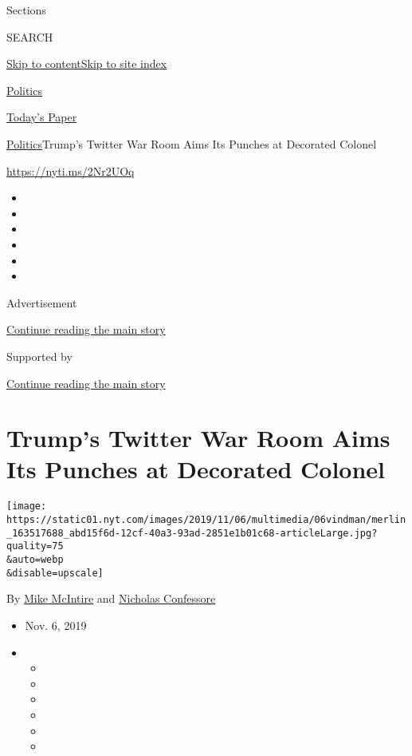 Sections

SEARCH

\protect\hyperlink{site-content}{Skip to
content}\protect\hyperlink{site-index}{Skip to site index}

\href{https://www.nytimes.com/section/politics}{Politics}

\href{https://myaccount.nytimes.com/auth/login?response_type=cookie\&client_id=vi}{}

\href{https://www.nytimes.com/section/todayspaper}{Today's Paper}

\href{/section/politics}{Politics}\textbar{}Trump's Twitter War Room
Aims Its Punches at Decorated Colonel

\url{https://nyti.ms/2Nr2UOq}

\begin{itemize}
\item
\item
\item
\item
\item
\item
\end{itemize}

Advertisement

\protect\hyperlink{after-top}{Continue reading the main story}

Supported by

\protect\hyperlink{after-sponsor}{Continue reading the main story}

\hypertarget{trumps-twitter-war-room-aims-its-punches-at-decorated-colonel}{%
\section{Trump's Twitter War Room Aims Its Punches at Decorated
Colonel}\label{trumps-twitter-war-room-aims-its-punches-at-decorated-colonel}}

\texttt{[image: https://static01.nyt.com/images/2019/11/06/multimedia/06vindman/merlin\_163517688\_abd15f6d-12cf-40a3-93ad-2851e1b01c68-articleLarge.jpg?quality=75\\\&auto=webp\\\&disable=upscale]}

By \href{https://www.nytimes.com/by/mike-mcintire}{Mike McIntire} and
\href{https://www.nytimes.com/by/nicholas-confessore}{Nicholas
Confessore}

\begin{itemize}
\item
  Nov. 6, 2019
\item
  \begin{itemize}
  \item
  \item
  \item
  \item
  \item
  \item
  \end{itemize}
\end{itemize}

